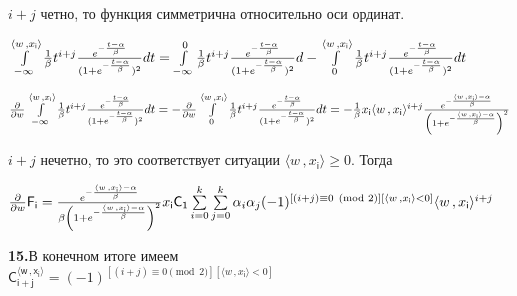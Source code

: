 \documentclass[a4paper,12pt]{article}
\begin{document}
 $i + j$ четно, то функция симметрична относительно оси ординат.

\begin{center}
    $\int\limits_{-\infty}^{\langle w \,, x_{\mathsf{i}}\rangle} {1\over{\beta}} t^{i + j} {e^{-{t - \alpha\over{\beta}}}\over{(1 + e^{-{t - \alpha\over{\beta}}}})^2} d t =
    \int\limits_{-\infty}^{0} {1\over{\beta}} t^{i + j} {e^{-{t - \alpha\over{\beta}}}\over{(1 + e^{-{t - \alpha\over{\beta}}}})^2} d - \int\limits_{0}^{\langle w \,, x_{\mathsf{i}}\rangle} {1\over{\beta}} t^{i + j} {e^{-{t - \alpha\over{\beta}}}\over{(1 + e^{-{t - \alpha\over{\beta}}}})^2} d t$
\end{center}

\begin{center}
    ${\partial\over{\partial w}}\int\limits_{-\infty}^{\langle w \,, x_{\mathsf{i}}\rangle} {1\over{\beta}} t^{i + j} {e^{-{t - \alpha\over{\beta}}}\over{(1 + e^{-{t - \alpha\over{\beta}}}})^2} d t = - {\partial\over{\partial w}}\int\limits_{0}^{\langle w \,, x_{\mathsf{i}}\rangle} {1\over{\beta}} t^{i + j} {e^{-{t - \alpha\over{\beta}}}\over{(1 + e^{-{t - \alpha\over{\beta}}}})^2} d t = -{1\over{\beta}}x_{\mathsf{i}}\langle w \,, x_{\mathsf{i}}\rangle^{i + j} {e^{-{\langle w \,, x_{\mathsf{i}}\rangle - \alpha\over{\beta}}}\over{\left(1 + e^{-{\langle w \,, x_{\mathsf{i}}\rangle - \alpha\over{\beta}}}\right)^2}}$
\end{center}

 $i + j$ нечетно, то это соответствует ситуации $\langle w \,, x_{\mathsf{i}}\rangle \geq{0}$. Тогда

\begin{center}
    ${\partial\over{\partial w}} \mathsf{F_i} = {e^{-{\langle w \,, x_{\mathsf{i}}\rangle - \alpha\over{\beta}}}\over{\beta\left(1 + e^{-{\langle w \,, x_{\mathsf{i}}\rangle - \alpha\over{\beta}}}\right)^2}}x_{\mathsf{i}}\mathsf{C_1} \sum\limits_{i = 0}^k \sum\limits_{j = 0}^k \alpha_i \alpha_j  (-1)^{[(i + j) \equiv 0 \pmod{2}][\langle w \,, x_{\mathsf{i}}\rangle < 0]} \langle w \,, x_{\mathsf{i}}\rangle^{i + j}$
\end{center}

\noindent\textbf{15.}В конечном итоге имеем\\

 $\mathsf{C^{\langle w \,, x_{\mathsf{i}}\rangle}_{i + j}} = (-1)^{[(i + j) \equiv 0 \pmod{2}][\langle w \,, x_{\mathsf{i}}\rangle < 0]}$
\end{document}
